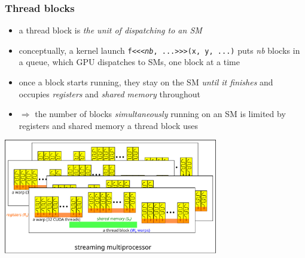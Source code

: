 \documentclass[12pt,dvipdfmx]{beamer}
\newcommand{\ao}[1]{{\color{blue}#1}}
\begin{document}
\begin{frame}
  \frametitle{Thread blocks}
  \begin{itemize}
  \item a thread block is \ao{\it the unit of dispatching to an SM}
  \item conceptually, a kernel launch {\tt f<<<{\it nb}, ...>>>(x, y, ...)}
    puts  {\it nb} blocks in a queue, which GPU dispatches to SMs,
    one block at a time
  \item once a block starts running, they stay on the SM \ao{\it until it finishes}
    and occupies \ao{\it registers} and \ao{\it shared memory} throughout
  \item $\Rightarrow$ the number of blocks {\it simultaneously} running on an SM
    is limited by registers and shared memory a thread block uses
  \end{itemize}
  \begin{center}
    \includegraphics[width=0.7\textwidth]{out/pdf/svg/warp_block_sm_5.pdf}
  \end{center}
\end{frame}
\end{document}
